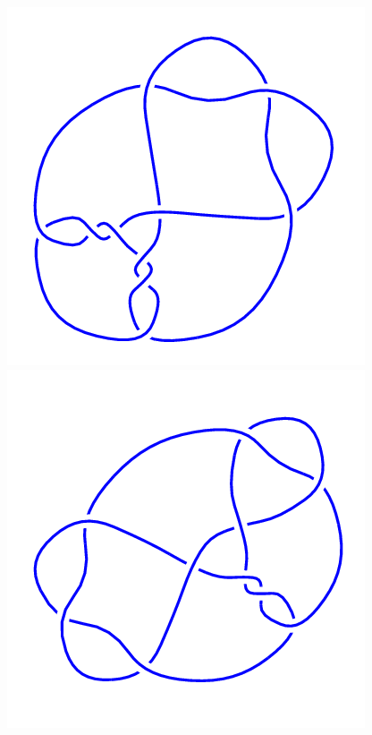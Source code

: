 \begin{figure}[H]
\begin{minipage}[b]{.18\linewidth}
    \end{minipage}
    \begin{minipage}[b]{.18\linewidth}
        \centering
        \includegraphics[width=\linewidth]{../data/10_64.png}
    \end{minipage}
    \begin{minipage}[b]{.18\linewidth}
        \centering
        \includegraphics[width=\linewidth]{../data/10_65.png}

\end{minipage}
\end{figure}
